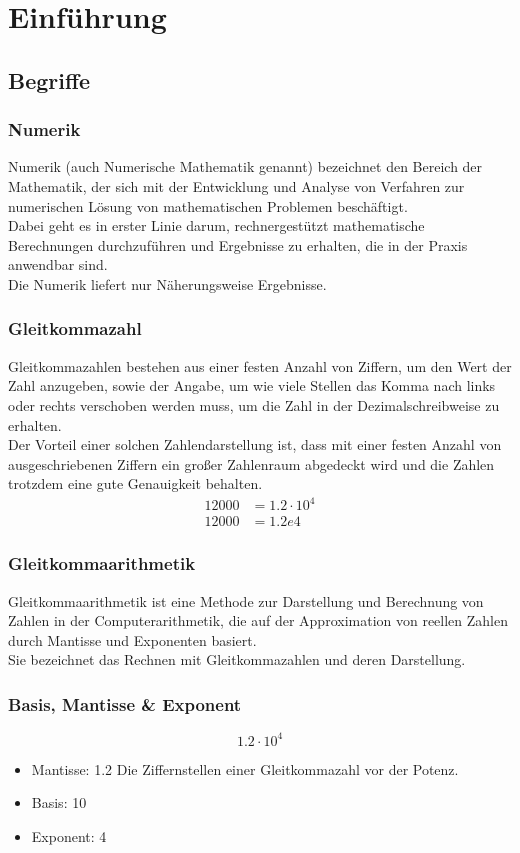 \section {Einführung}

\subsection{Begriffe}

\subsubsection{Numerik}
Numerik (auch Numerische Mathematik genannt) bezeichnet den Bereich der Mathematik, der sich mit der Entwicklung und Analyse von Verfahren zur numerischen Lösung von mathematischen Problemen beschäftigt. \\
Dabei geht es in erster Linie darum, rechnergestützt mathematische Berechnungen durchzuführen und Ergebnisse zu erhalten, die in der Praxis anwendbar sind. \\
Die Numerik liefert nur Näherungsweise Ergebnisse.

\subsubsection{Gleitkommazahl}
Gleitkommazahlen bestehen aus einer festen Anzahl von Ziffern, um den Wert der Zahl anzugeben, sowie der Angabe, um wie viele Stellen das Komma nach links oder rechts verschoben werden muss, um die Zahl in der Dezimalschreibweise zu erhalten. \\
Der Vorteil einer solchen Zahlendarstellung ist, dass mit einer festen Anzahl von ausgeschriebenen Ziffern ein großer Zahlenraum abgedeckt wird und die Zahlen trotzdem eine gute Genauigkeit behalten.
\begin{align*}
	12000  &=  1.2\cdot10^4 \\
	12000 &=  1.2e4
\end{align*}

\subsubsection{Gleitkommaarithmetik} 
Gleitkommaarithmetik ist eine Methode zur Darstellung und Berechnung von Zahlen in der Computerarithmetik, die auf der Approximation von reellen Zahlen durch Mantisse und Exponenten basiert. \\
Sie bezeichnet das Rechnen mit Gleitkommazahlen und deren Darstellung.
\subsubsection{Basis, Mantisse \& Exponent}
\begin{displaymath}
	1.2 \cdot 10^4
\end{displaymath}
\begin{itemize}
	\item Mantisse: 1.2 \newline
	Die Ziffernstellen einer Gleitkommazahl vor der Potenz.
	\item Basis: 10
	\item Exponent: 4
\end{itemize}

